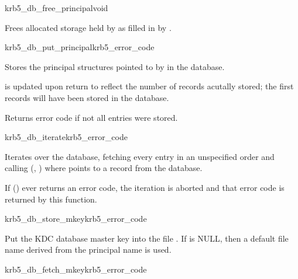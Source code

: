 \begin{funcdecl}{krb5_db_free_principal}{void}{\funcin}
\end{funcdecl}

Frees allocated storage held by  as filled in by
.


\begin{funcdecl}{krb5_db_put_principal}{krb5_error_code}{\funcin}
\end{funcdecl}

Stores the  principal structures pointed to by
 in the database.

 is updated upon return to reflect the number of records
acutally stored; the first  records will have been
stored in the database.

Returns error code if not all entries were stored.

\begin{funcdecl}{krb5_db_iterate}{krb5_error_code}{\funcin}
\funcendfuncarg
{}
\end{funcdecl}

Iterates over the database, fetching every entry in an unspecified order
and calling (,
) where  points to a record from the
database.

If () ever returns an error code, the iteration is
aborted and that error code is returned by this function.

\begin{funcdecl}{krb5_db_store_mkey}{krb5_error_code}{\funcin}
\end{funcdecl}

Put the KDC database master key into the file . If
 is NULL, then a default file name derived from the
principal name  is used.

\begin{funcdecl}{krb5_db_fetch_mkey}{krb5_error_code}{\funcin}
\funcinout
{}
\end{funcdecl}

